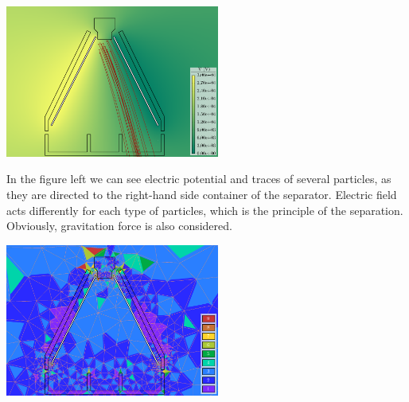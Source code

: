 \documentclass[portrait, a1paper, fontscale=0.5]{baposter}
\begin{document}
\begin{poster}
{\begin{center}
	\begin{minipage}{20em}
		\centering
	 	\includegraphics[width=19em]{particle_tracing/scalar_potential_and_particles.png}
	\end{minipage} 
	\begin{minipage}{11em}
		In the figure left we can see electric potential and traces of several particles, as they are directed to the right-hand side container of the separator. Electric field acts differently for each type of particles, which is the principle of the separation. Obviously, gravitation force is also considered.
	\end{minipage}
	\begin{minipage}{20em}
		\centering
	 	\includegraphics[width=19em]{particle_tracing/mesh_and_polynomial_order.png}
	\end{minipage} 
\end{center}

}
\end{poster}
\end{document}

